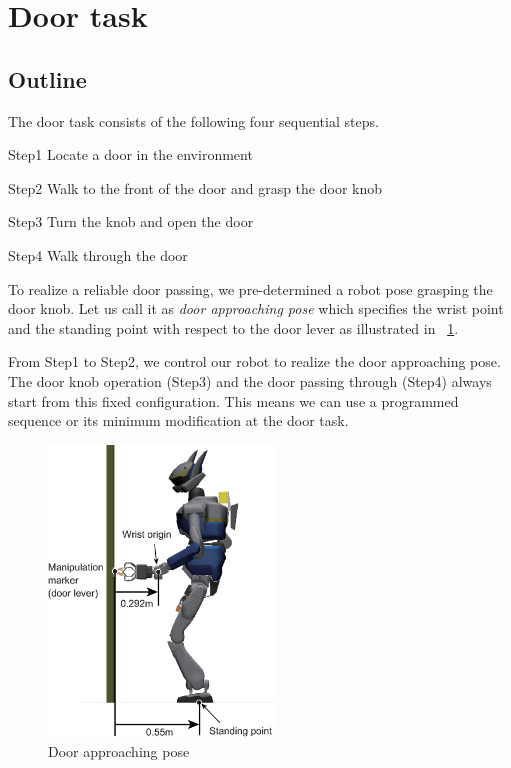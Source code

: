 \section{Door task}
	\label{sub:door}

\subsection{Outline}
%
The door task consists of the following four sequential steps.
%
\begin{description}
\item{Step1} Locate a door in the environment
\item{Step2} Walk to the front of the door and grasp the door knob
\item{Step3} Turn the knob and open the door
\item{Step4} Walk through the door
\end{description}
%

%

To realize a reliable door passing, we pre-determined
a robot pose grasping the door knob.
Let us call it as {\it door approaching pose} which specifies the
wrist point and the standing point with respect to the door lever
as illustrated in \figurename~\ref{fig:door_approaching_config}.

From Step1 to Step2, we control our robot to realize the door approaching pose.
The door knob operation (Step3) and the door passing through (Step4) always start
from this fixed configuration. This means we can use a programmed sequence or its minimum
modification at the door task.  

\begin{figure}[t]
  \centering
  \includegraphics[width = 6cm]{img/door_approaching_config.eps}
  \caption{Door approaching pose}
  \label{fig:door_approaching_config}
\end{figure}
        
